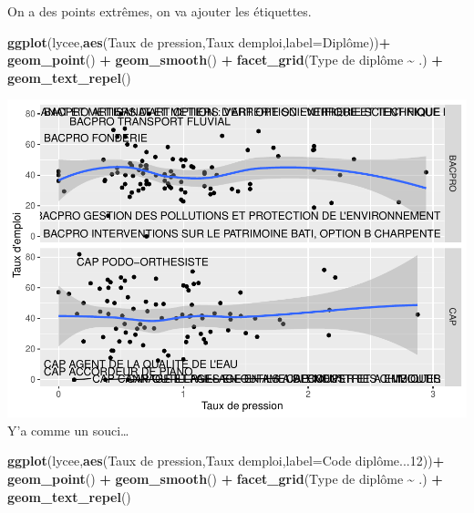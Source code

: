\documentclass[
]{book}
\newenvironment{Shaded}{\begin{snugshade}}{\end{snugshade}}
\newcommand{\AttributeTok}[1]{\textcolor[rgb]{0.13,0.29,0.53}{#1}}
\newcommand{\FunctionTok}[1]{\textcolor[rgb]{0.13,0.29,0.53}{\textbf{#1}}}
\newcommand{\NormalTok}[1]{#1}
\newcommand{\SpecialCharTok}[1]{\textcolor[rgb]{0.81,0.36,0.00}{\textbf{#1}}}
\newcommand{\StringTok}[1]{\textcolor[rgb]{0.31,0.60,0.02}{#1}}
\begin{document}
On a des points extrêmes, on va ajouter les étiquettes.

\begin{Shaded}
\begin{Highlighting}[]
\FunctionTok{ggplot}\NormalTok{(lycee,}\FunctionTok{aes}\NormalTok{(}\StringTok{\textasciigrave{}}\AttributeTok{Taux de pression}\StringTok{\textasciigrave{}}\NormalTok{,}\StringTok{\textasciigrave{}}\AttributeTok{Taux d\textquotesingle{}emploi}\StringTok{\textasciigrave{}}\NormalTok{,}\AttributeTok{label=}\NormalTok{Diplôme))}\SpecialCharTok{+}
  \FunctionTok{geom\_point}\NormalTok{() }\SpecialCharTok{+} \FunctionTok{geom\_smooth}\NormalTok{()  }\SpecialCharTok{+} \FunctionTok{facet\_grid}\NormalTok{(}\StringTok{\textasciigrave{}}\AttributeTok{Type de diplôme}\StringTok{\textasciigrave{}} \SpecialCharTok{\textasciitilde{}}\NormalTok{ .) }\SpecialCharTok{+} 
  \FunctionTok{geom\_text\_repel}\NormalTok{()}
\end{Highlighting}
\end{Shaded}

\includegraphics{_main_files/figure-latex/lycee5-1.pdf}
Y'a comme un souci\ldots{}

\begin{Shaded}
\begin{Highlighting}[]
\FunctionTok{ggplot}\NormalTok{(lycee,}\FunctionTok{aes}\NormalTok{(}\StringTok{\textasciigrave{}}\AttributeTok{Taux de pression}\StringTok{\textasciigrave{}}\NormalTok{,}\StringTok{\textasciigrave{}}\AttributeTok{Taux d\textquotesingle{}emploi}\StringTok{\textasciigrave{}}\NormalTok{,}\AttributeTok{label=}\StringTok{\textasciigrave{}}\AttributeTok{Code diplôme...12}\StringTok{\textasciigrave{}}\NormalTok{))}\SpecialCharTok{+}
  \FunctionTok{geom\_point}\NormalTok{() }\SpecialCharTok{+} \FunctionTok{geom\_smooth}\NormalTok{()  }\SpecialCharTok{+} \FunctionTok{facet\_grid}\NormalTok{(}\StringTok{\textasciigrave{}}\AttributeTok{Type de diplôme}\StringTok{\textasciigrave{}} \SpecialCharTok{\textasciitilde{}}\NormalTok{ .) }\SpecialCharTok{+} 
  \FunctionTok{geom\_text\_repel}\NormalTok{()}
\end{Highlighting}
\end{Shaded}
\end{document}
